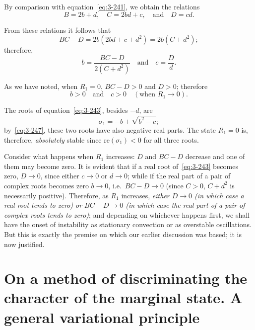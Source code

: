 By comparison with equation~\eqref{eq:3-241}, we obtain the relations
\begin{equation}\label{eq:3-244}
B = 2b + d, \quad C = 2bd + c, \quad \text{and} \quad D = cd.
\end{equation}

From these relations it follows that
\begin{equation}\label{eq:3-245}
BC - D = 2b(2bd + c + d^2) = 2b(C + d^2);
\end{equation}
therefore,
\begin{equation}\label{eq:3-246}
b = \frac{BC - D}{2(C + d^2)} \quad \text{and} \quad c = \frac{D}{d}.
\end{equation}

As we have noted, when $R_1 = 0$, $BC - D > 0$ and $D > 0$; therefore
\begin{equation}\label{eq:3-247}
b > 0 \quad \text{and} \quad c > 0 \quad (\text{when } R_1 \to 0).
\end{equation}

The roots of equation~\eqref{eq:3-243}, besides $-d$, are
\begin{equation}\label{eq:3-248a}
\sigma_1 = -b \pm \sqrt{b^2 - c};
\end{equation}
by~\eqref{eq:3-247}, these two roots have also negative real parts. The state $R_1 = 0$ is, therefore, \emph{absolutely} stable since $\mathrm{re}(\sigma_1) < 0$ for all three roots.

Consider what happens when $R_1$ increases: $D$ and $BC - D$ decrease and one of them may become zero. It is evident that if a real root of~\eqref{eq:3-243} becomes zero, $D \to 0$, since either $c \to 0$ or $d \to 0$; while if the real part of a pair of complex roots becomes zero $b \to 0$, i.e.\ $BC - D \to 0$ (since $C > 0$, $C + d^2$ is necessarily positive). Therefore, as $R_1$ increases, \emph{either $D \to 0$ (in which case a real root tends to zero) or $BC - D \to 0$ (in which case the real part of a pair of complex roots tends to zero)}; and depending on whichever happens first, we shall have the onset of instability as stationary convection or as overstable oscillations. But this is exactly the premise on which our earlier discussion was based; it is now justified.

\section{On a method of discriminating the character of the marginal state. A general variational principle}\label{sec:3-30}

